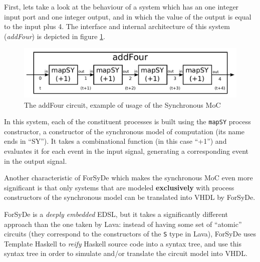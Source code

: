 \documentclass[a4paper]{article}
\begin{document}
                First, lets take a look at the behaviour of a system which has an one integer input
                port and one integer output, and in which the value of the output is equal to the
                input plus 4. The interface and internal architecture of this system
                (\emph{addFour}) is depicted in figure \ref{fig:forsyde-addFour}.
                \begin{figure}[h!]
                    \begin{center}
                        \includegraphics[width=1.0\textwidth]{imgs/forsyde-addFour.pdf}
                    \end{center}
                    \caption{The addFour circuit, example of usage of the Synchronous MoC
                        \label{fig:forsyde-addFour}}
                \end{figure}

                In this system, each of the constituent processes is built using the \texttt{mapSY}
                process constructor, a constructor of the synchronous model of computation (its name
                ends in ``SY''). It takes a combinational function (in this case ``+1'') and
                evaluates it for each event in the input signal, generating a corresponding event in
                the output signal.

                Another characteristic of ForSyDe which makes the synchronous MoC even more
                significant is that only systems that are modeled \textbf{exclusively} with process
                constructors of the synchronous model can be translated into VHDL by ForSyDe.

                ForSyDe is a \emph{deeply embedded} EDSL, but it takes a significantly different
                approach than the one taken by Lava: instead of having some set of ``atomic''
                circuits (they correspond to the constructors of the \texttt{S} type in Lava),
                ForSyDe uses Template Haskell to \emph{reify} Haskell source code into a syntax
                tree, and use this syntax tree in order to simulate and/or translate the circuit
                model into VHDL.
\end{document}
